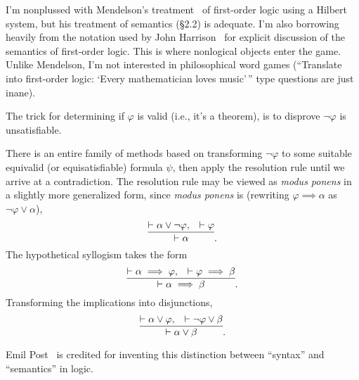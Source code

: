 \begin{node}\label{fol-0000}%
I'm nonplussed with Mendelson's treatment~\cite{mendelson2015mathematical}
of first-order logic using a Hilbert system, but his treatment of
semantics (\S2.2) is adequate. I'm also borrowing heavily from the
notation used by John Harrison~\cite{harrison2009handbook} for explicit
discussion of the semantics of first-order logic. This is where nonlogical
objects enter the game. Unlike Mendelson, I'm not interested in
philosophical word games (``Translate into first-order logic: `Every
mathematician loves music'\,'' type questions are just inane).
\end{node}


\begin{node}\label{fol-000M}%
The trick for determining if $\varphi$ is valid (i.e., it's a theorem),
is to disprove $\neg\varphi$ is unsatisfiable.

\begin{node}\label{fol-000N}%
There is an entire family of methods based on transforming $\neg\varphi$ to
some suitable equivalid (or equisatisfiable) formula $\psi$, then apply
the resolution rule until we arrive at a contradiction. The resolution
rule may be viewed as \textit{modus ponens} in a slightly more
generalized form, since \textit{modus ponens} is (rewriting
$\varphi\implies\alpha$ as $\neg\varphi\lor\alpha$),
\begin{equation*}
\infer{\vdash \alpha}{\vdash\alpha\lor\neg\varphi,&\vdash\varphi}.
\end{equation*}
The hypothetical syllogism takes the form
\begin{equation*}
\infer{\vdash\alpha\implies\beta}{\vdash\alpha\implies\varphi,&\vdash\varphi\implies\beta}.
\end{equation*}
Transforming the implications into disjunctions,
\begin{equation}
\infer{\vdash \alpha\lor\beta}{\vdash\alpha\lor\varphi,&\vdash\neg\varphi\lor\beta}.
\end{equation}
\end{node}
\end{node}

\begin{node}[References]\label{fol-000J}%
Emil Post~\cite{post1921introduction} is credited for inventing this
distinction between ``syntax'' and ``semantics'' in logic.
\end{node}
